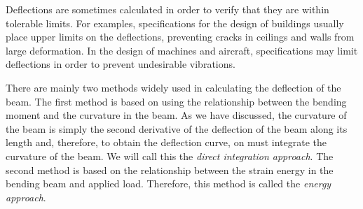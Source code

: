 \documentclass[a4paper,openany,nobib]{tufte-book}
\begin{document}
Deflections are sometimes calculated in order to verify that they are
within tolerable limits. For examples, specifications for the design of
buildings usually place upper limits on the deflections, preventing
cracks in ceilings and walls from large deformation. In the design of
machines and aircraft, specifications may limit deflections in order to
prevent undesirable vibrations.

There are mainly two methods widely used in calculating the deflection
of the beam. The first method is based on using the relationship between
the bending moment and the curvature in the beam. As we have discussed,
the curvature of the beam is simply the second derivative of the
deflection of the beam along its length and, therefore, to obtain the
deflection curve, on must integrate the curvature of the beam. We will
call this the \emph{direct integration approach}. The second method is based
on the relationship between the strain energy in the bending beam and
applied load. Therefore, this method is called the \emph{energy approach}.
\end{document}

